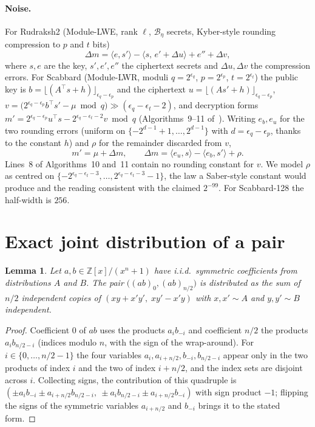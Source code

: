 \documentclass[11pt,a4paper]{article}
\newtheorem{lemma}{Lemma}
\theoremstyle{definition}
\theoremstyle{remark}
\newcommand{\Z}{\mathbb{Z}}
\newcommand{\CBD}{\mathcal{B}}
\newcommand{\Dm}{\Delta m}
\begin{document}
\paragraph{Noise.}
For Rudraksh2 (Module-LWE, rank $\ell$, $\CBD_\eta$ secrets, Kyber-style
rounding compression to $p$ and $t$ bits)
\[
\Dm=\langle e,s'\rangle-\langle s,\,e'+\Delta u\rangle+e''+\Delta v,
\]
where $s,e$ are the key, $s',e',e''$ the ciphertext secrets and
$\Delta u,\Delta v$ the compression errors. For Scabbard (Module-LWR, moduli
$q=2^{\epsilon_q}$, $p=2^{\epsilon_p}$, $t=2^{\epsilon_t}$) the public key
is $b=\lfloor(A^\top s+h)\rfloor_{\epsilon_q-\epsilon_p}$ and the ciphertext
$u=\lfloor(As'+h)\rfloor_{\epsilon_q-\epsilon_p}$,
$v=\bigl(2^{\epsilon_q-\epsilon_p}b^\top s'-\mu\bmod q\bigr)\gg(\epsilon_q-\epsilon_t-2)$,
and decryption forms
$m'=2^{\epsilon_q-\epsilon_p}u^\top s-2^{\epsilon_q-\epsilon_t-2}v\bmod q$
(Algorithms~9--11 of~\cite{Scabbard}). Writing $e_b,e_u$ for the two
rounding errors (uniform on $\{-2^{d-1}+1,\dots,2^{d-1}\}$ with
$d=\epsilon_q-\epsilon_p$, thanks to the constant $h$) and $\rho$ for the
remainder discarded from $v$,
\[
m'=\mu+\Dm,\qquad \Dm=\langle e_u,s\rangle-\langle e_b,s'\rangle+\rho .
\]
Lines~8 of Algorithms~10 and~11 contain no rounding constant for $v$. We
model $\rho$ as centred on
$\{-2^{\epsilon_q-\epsilon_t-3},\dots,2^{\epsilon_q-\epsilon_t-3}-1\}$,
the law a Saber-style constant would produce and the reading consistent
with the claimed $2^{-99}$. For Scabbard-128 the half-width is $256$.

\section{Exact joint distribution of a pair}
\label{sec:pair}

\begin{lemma}
\label{lem:atom}
Let $a,b\in\Z[x]/(x^n+1)$ have i.i.d.\ symmetric coefficients from
distributions $A$ and $B$. The pair $\bigl((ab)_0,(ab)_{n/2}\bigr)$ is
distributed as the sum of $n/2$ independent copies of
$(xy+x'y',\;xy'-x'y)$ with $x,x'\sim A$ and $y,y'\sim B$ independent.
\end{lemma}

\begin{proof}
Coefficient $0$ of $ab$ uses the products $a_ib_{-i}$ and coefficient $n/2$
the products $a_ib_{n/2-i}$ (indices modulo $n$, with the sign of the
wrap-around). For $i\in\{0,\dots,n/2-1\}$ the four variables
$a_i,a_{i+n/2},b_{-i},b_{n/2-i}$ appear only in the two products of index
$i$ and the two of index $i+n/2$, and the index sets are disjoint across
$i$. Collecting signs, the contribution of this quadruple is
$(\pm a_ib_{-i}\pm a_{i+n/2}b_{n/2-i},\ \pm a_ib_{n/2-i}\pm a_{i+n/2}b_{-i})$
with sign product $-1$; flipping the signs of the symmetric variables
$a_{i+n/2}$ and $b_{-i}$ brings it to the stated form.
\end{proof}
\end{document}
